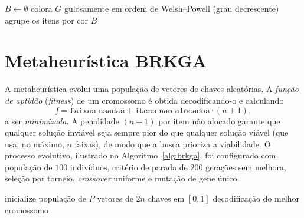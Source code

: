 \documentclass{report}
\begin{document}
\begin{algorithm}[h]
\caption{Heurística gulosa: coloração + First-Fit-Decreasing por cor}
\label{alg:ffd}
$B \leftarrow \emptyset$\;
colora $G$ gulosamente em ordem de Welsh--Powell (grau decrescente)\;
agrupe os itens por cor\;
\Return $B$\;
\end{algorithm}

\section{Metaheurística BRKGA}

A metaheurística evolui uma população de vetores de chaves aleatórias. A
\emph{função de aptidão} (\textit{fitness}) de um cromossomo é obtida
decodificando-o e calculando
\[
f = \texttt{faixas\_usadas} + \texttt{itens\_nao\_alocados}\cdot (n+1),
\]
a ser \emph{minimizada}. A penalidade $(n+1)$ por item não alocado garante que
qualquer solução inviável seja sempre pior do que qualquer solução viável (que
usa, no máximo, $n$ faixas), de modo que a busca prioriza a viabilidade. O
processo evolutivo, ilustrado no Algoritmo~\ref{alg:brkga}, foi configurado com
população de $100$ indivíduos, critério de parada de $200$ gerações sem melhora,
seleção por torneio, \textit{crossover} uniforme e mutação de gene único.

\begin{algorithm}[h]
\caption{BRKGA para o empacotamento com conflitos}
\label{alg:brkga}
inicialize população de $P$ vetores de $2n$ chaves em $[0,1]$\;
\Return decodificação do melhor cromossomo\;
\end{algorithm}
\end{document}
